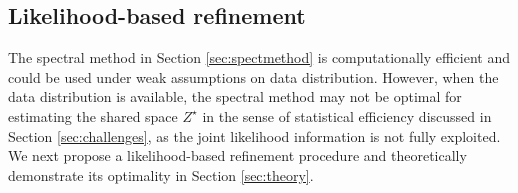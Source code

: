 \documentclass[12pt]{article}
\newcommand{\blue}[1]{\textcolor{blue}{#1}}
\newcommand{\mytrans}{\top}
\begin{document}




 







\subsection{Likelihood-based refinement} \label{sec:likeestimator}


The spectral method in Section \ref{sec:spectmethod} is computationally efficient and could be used under    weak assumptions on data distribution. 
However, when the data distribution is available, 
the spectral method may not be optimal for estimating the shared space  $Z^{\star}$ in the sense of statistical efficiency discussed in Section \ref{sec:challenges}, as the joint likelihood information is not fully exploited. 
We next propose a likelihood-based refinement procedure 
and theoretically demonstrate its optimality in Section \ref{sec:theory}. 
\end{document}
